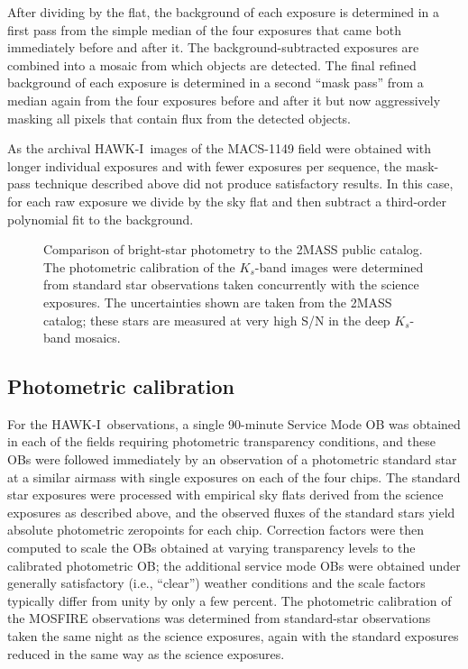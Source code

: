 \documentclass[preprint2]{aastex6}
\gdef\HAWKI{\mbox{HAWK-I}}
\begin{document}
After dividing by the flat, the background of each exposure is determined in a first pass from the simple median of the four exposures that came both immediately before and after it.  The background-subtracted exposures are combined into a mosaic from which objects are detected.  The final refined background of each exposure is determined in a second ``mask pass'' from a median again from the four exposures before and after it but now aggressively masking all pixels that contain flux from the detected objects.

As the archival \HAWKI\ images of the MACS-1149 field were obtained with longer individual exposures and with fewer exposures per sequence, the mask-pass technique described above did not produce satisfactory results.  In this case, for each raw exposure we divide by the sky flat and then subtract a third-order polynomial fit to the background.  

\begin{figure}[!t]
\caption{Comparison of bright-star photometry to the 2MASS public catalog.  The photometric calibration of the $K_s$-band images were determined from standard star observations taken concurrently with the science exposures.  The uncertainties shown are taken from the 2MASS catalog; these stars are measured at very high S/N in the deep $K_s$-band mosaics.  \label{fig:2mass}}  
\end{figure}

\subsection{Photometric calibration}
\label{s:calib}

For the \HAWKI\ observations, a single 90-minute Service Mode OB was obtained in each of the fields requiring photometric transparency conditions, and these OBs were followed immediately by an observation of a photometric standard star at a similar airmass with single exposures on each of the four chips.  The standard star exposures were processed with empirical sky flats derived from the science exposures as described above, and the observed fluxes of the standard stars yield absolute photometric zeropoints for each chip.  Correction factors were then computed to scale the OBs obtained at varying transparency levels to the calibrated photometric OB; the additional service mode OBs were obtained under generally satisfactory (i.e., ``clear'') weather conditions and the scale factors typically differ from unity by only a few percent.  The photometric calibration of the MOSFIRE observations was determined from standard-star observations taken the same night as the science exposures, again with the standard exposures reduced in the same way as the science exposures.
\end{document}
